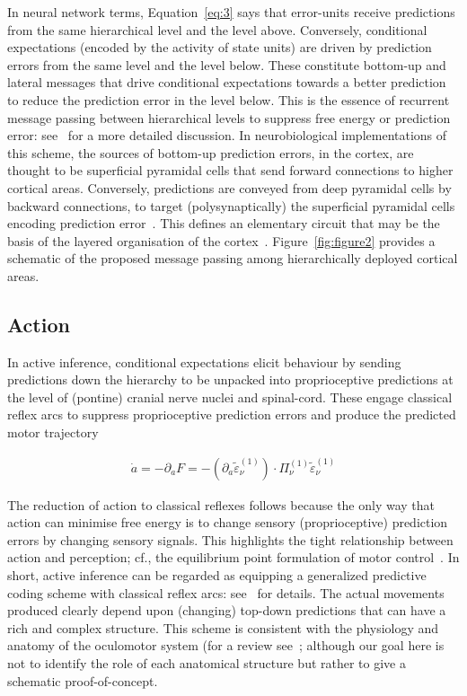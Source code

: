 \documentclass[a4paper]{article} %
\begin{document}
In neural network terms, Equation~\ref{eq:3} says that error-units receive
predictions from the same hierarchical level and the level above.
Conversely, conditional expectations (encoded by the activity of state
units) are driven by prediction errors from the same level and the level
below. These constitute bottom-up and lateral messages that drive
conditional expectations towards a better prediction to reduce the
prediction error in the level below. This is the essence of recurrent
message passing between hierarchical levels to suppress free energy or
prediction error: see~\citep{Friston09b} for a more detailed
discussion. In neurobiological implementations of this scheme, the
sources of bottom-up prediction errors, in the cortex, are thought to be
superficial pyramidal cells that send forward connections to higher
cortical areas. Conversely, predictions are conveyed from deep pyramidal
cells by backward connections, to target (polysynaptically) the
superficial pyramidal cells encoding prediction error~\citep{Friston09b,Mumford92}. This defines an elementary circuit that may
be the basis of the layered organisation of the cortex~\citep{Bastos12}. Figure~\ref{fig:figure2} provides a schematic of the proposed message passing
among hierarchically deployed cortical areas.

\subsection{Action}
\label{sec:action}
In active inference, conditional expectations elicit behaviour by
sending predictions down the hierarchy to be unpacked into
proprioceptive predictions at the level of (pontine) cranial nerve
nuclei and spinal-cord. These engage classical reflex arcs to suppress
proprioceptive prediction errors and produce the predicted motor
trajectory

\begin{align}
\dot{a} =  - \partial_a F = -(\partial_a \tilde{\varepsilon}^{(1)}_\nu) \cdot \Pi^{(1)}_\nu \tilde{\varepsilon}^{(1)}_\nu  \label{eq:4} %
\end{align}%

The reduction of action to classical reflexes follows because the only
way that action can minimise free energy is to change sensory
(proprioceptive) prediction errors by changing sensory signals. This
highlights the tight relationship between action and perception; cf.,
the equilibrium point formulation of motor control~\citep{Feldman95}. In short, active inference can be regarded as equipping a
generalized predictive coding scheme with classical reflex arcs: see~\citep{Friston10a,Friston09c} for details. The actual
movements produced clearly depend upon (changing) top-down predictions
that can have a rich and complex structure. This scheme is consistent
with the physiology and anatomy of the oculomotor system (for a review
see~\citep{Ilg97,Krauzlis04}; although our goal here is not to identify
the role of each anatomical structure but rather to give a schematic
proof-of-concept.
\end{document}
